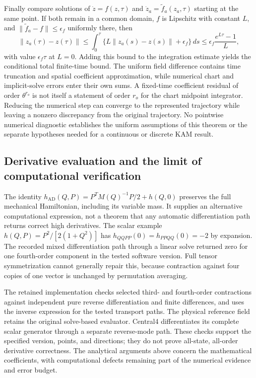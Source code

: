 Finally compare solutions of $\dot z=f(z,\tau)$ and $\dot z_a=\widetilde f_a(z_a,\tau)$ starting at the same point. If both remain in a common domain, $f$ is Lipschitz with constant $L$, and $\|\widetilde f_a-f\|\le\epsilon_f$ uniformly there, then
\begin{equation}
 \|z_a(\tau)-z(\tau)\|
 \le\int_0^\tau\{L\|z_a(s)-z(s)\|+\epsilon_f\}\,ds
 \le\epsilon_f\frac{e^{L\tau}-1}{L},
 \label{eq:sup-gronwall}
\end{equation}
with value $\epsilon_f\tau$ at $L=0$. Adding this bound to the integration estimate yields the conditional total finite-time bound. The uniform field difference contains time truncation and spatial coefficient approximation, while numerical chart and implicit-solve errors enter their own sums. A fixed-time coefficient residual of order $\theta^{r_o}$ is not itself a statement of order $r_o$ for the chart midpoint integrator. Reducing the numerical step can converge to the represented trajectory while leaving a nonzero discrepancy from the original trajectory. No pointwise numerical diagnostic establishes the uniform assumptions of this theorem or the separate hypotheses needed for a continuous or discrete KAM result.

\subsection{Derivative evaluation and the limit of computational verification}
The identity $h_{\mathrm{AD}}(Q,P)=P^TM(Q)^{-1}P/2+h(Q,0)$ preserves the full mechanical Hamiltonian, including its variable mass. It supplies an alternative computational expression, not a theorem that any automatic differentiation path returns correct high derivatives. The scalar example $h(Q,P)=P^2/[2(1+Q^2)]$ has $h_{QQPP}(0)=h_{PPQQ}(0)=-2$ by expansion. The recorded mixed differentiation path through a linear solve returned zero for one fourth-order component in the tested software version. Full tensor symmetrization cannot generally repair this, because contraction against four copies of one vector is unchanged by permutation averaging.

The retained implementation checks selected third- and fourth-order contractions against independent pure reverse differentiation and finite differences, and uses the inverse expression for the tested transport paths. The physical reference field retains the original solve-based evaluator. Central4 differentiates its complete scalar generator through a separate reverse-mode path. These checks support the specified version, points, and directions; they do not prove all-state, all-order derivative correctness. The analytical arguments above concern the mathematical coefficients, with computational defects remaining part of the numerical evidence and error budget.
